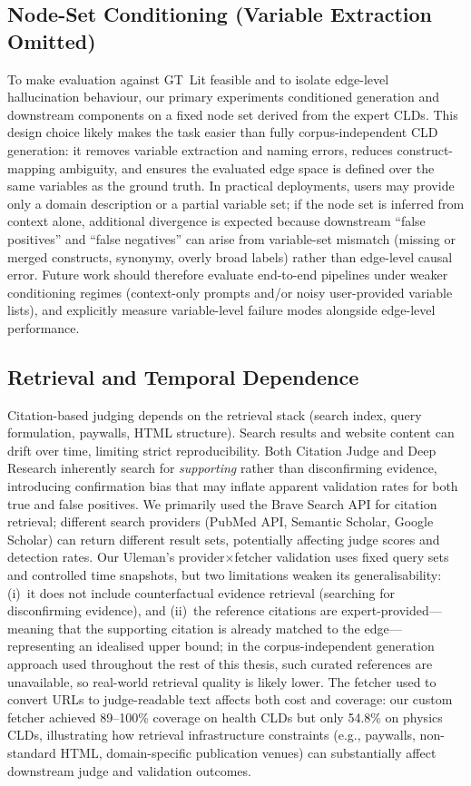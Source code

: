 \subsection{Node-Set Conditioning (Variable Extraction Omitted)}

To make evaluation against GT~Lit feasible and to isolate edge-level hallucination behaviour, our primary experiments conditioned generation and downstream components on a fixed node set derived from the expert CLDs. This design choice likely makes the task easier than fully corpus-independent CLD generation: it removes variable extraction and naming errors, reduces construct-mapping ambiguity, and ensures the evaluated edge space is defined over the same variables as the ground truth. In practical deployments, users may provide only a domain description or a partial variable set; if the node set is inferred from context alone, additional divergence is expected because downstream ``false positives'' and ``false negatives'' can arise from variable-set mismatch (missing or merged constructs, synonymy, overly broad labels) rather than edge-level causal error. Future work should therefore evaluate end-to-end pipelines under weaker conditioning regimes (context-only prompts and/or noisy user-provided variable lists), and explicitly measure variable-level failure modes alongside edge-level performance.

\subsection{Retrieval and Temporal Dependence}

Citation-based judging depends on the retrieval stack (search index, query formulation, paywalls, HTML structure). Search results and website content can drift over time, limiting strict reproducibility. Both Citation Judge and Deep Research inherently search for \emph{supporting} rather than disconfirming evidence, introducing confirmation bias that may inflate apparent validation rates for both true and false positives. We primarily used the Brave Search API for citation retrieval; different search providers (PubMed API, Semantic Scholar, Google Scholar) can return different result sets, potentially affecting judge scores and detection rates. Our Uleman's provider$\times$fetcher validation uses fixed query sets and controlled time snapshots, but two limitations weaken its generalisability: (i)~it does not include counterfactual evidence retrieval (searching for disconfirming evidence), and (ii)~the reference citations are expert-provided---meaning that the supporting citation is already matched to the edge---representing an idealised upper bound; in the corpus-independent generation approach used throughout the rest of this thesis, such curated references are unavailable, so real-world retrieval quality is likely lower. The fetcher used to convert URLs to judge-readable text affects both cost and coverage: our custom fetcher achieved 89--100\% coverage on health CLDs but only 54.8\% on physics CLDs, illustrating how retrieval infrastructure constraints (e.g., paywalls, non-standard HTML, domain-specific publication venues) can substantially affect downstream judge and validation outcomes.

